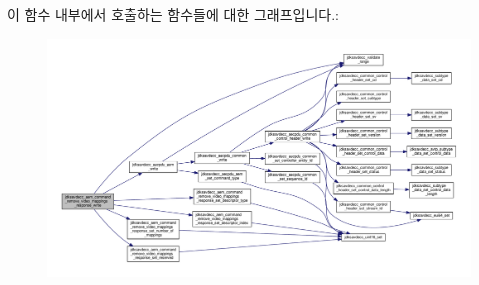 이 함수 내부에서 호출하는 함수들에 대한 그래프입니다.\+:
\nopagebreak
\begin{figure}[H]
\begin{center}
\leavevmode
\includegraphics[width=350pt]{group__command__remove__video__mappings__response_gae056489c217399094da15d7520072f17_cgraph}
\end{center}
\end{figure}



